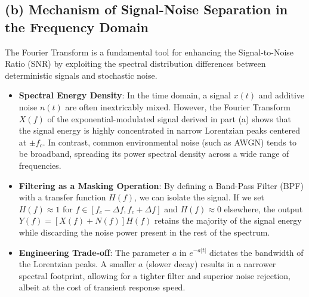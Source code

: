 \subsection*{(b) Mechanism of Signal-Noise Separation in the Frequency Domain}
The Fourier Transform is a fundamental tool for enhancing the Signal-to-Noise Ratio
(SNR) by exploiting the spectral distribution differences between deterministic
signals and stochastic noise.
\begin{itemize}
 \item \textbf{Spectral Energy Density}: In the time domain, a signal $x(t)$ and
additive noise $n(t)$ are often inextricably mixed. However, the Fourier Transform
$X(f)$ of the exponential-modulated signal derived in part (a) shows that the signal
energy is highly concentrated in narrow Lorentzian peaks centered at $\pm f_c$. In
contrast, common environmental noise (such as AWGN) tends to be broadband,
spreading its power spectral density across a wide range of frequencies.
 \item \textbf{Filtering as a Masking Operation}: By defining a Band-Pass Filter
(BPF) with a transfer function $H(f)$, we can isolate the signal. If we set $H(f)
\approx 1$ for $f \in [f_c - \Delta f, f_c + \Delta f]$ and $H(f) \approx 0$ elsewhere,
the output $Y(f) = [X(f) + N(f)]H(f)$ retains the majority of the signal energy while
discarding the noise power present in the rest of the spectrum.
 \item \textbf{Engineering Trade-off}: The parameter $a$ in $e^{-a|t|}$ dictates the
bandwidth of the Lorentzian peaks. A smaller $a$ (slower decay) results in a
narrower spectral footprint, allowing for a tighter filter and superior noise rejection,
albeit at the cost of transient response speed.
\end{itemize}
